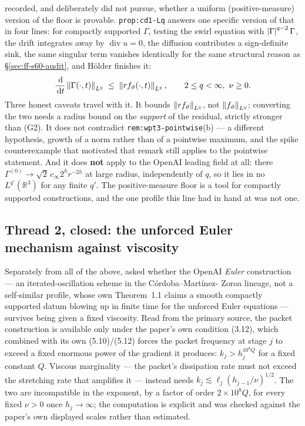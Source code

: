  recorded, and deliberately did not pursue, whether a uniform
(positive-measure) version of the floor is provable. \texttt{prop:cd1-Lq}
answers one specific version of that in four lines: for compactly supported
\(\Gamma\), testing the swirl equation with \(\left|\Gamma\right|^{q-2}\Gamma\), the
drift integrates away by \(\operatorname{div}u=0\), the diffusion contributes
a sign-definite sink, the same singular term vanishes identically for the
same structural reason as \S\ref{sec:ff-s60-audit}, and H\"older finishes it:
\[
\frac{\,\mathrm{d}}{\,\mathrm{d} t}\left\|\Gamma(\cdot,t)\right\|_{L^q}\;\le\;\left\|rf_\vartheta(\cdot,t)\right\|_{L^q},
\qquad 2\le q<\infty,\ \nu\ge0.
\]
Three honest caveats travel with it. It bounds \(\left\|rf_\vartheta\right\|_{L^q}\),
not \(\left\|f_\vartheta\right\|_{L^q}\); converting the two needs a radius bound on
the \emph{support} of the residual, strictly stronger than (G2). It does not
contradict \texttt{rem:wpt3-pointwise}(b) --- a different hypothesis, growth
of a norm rather than of a pointwise maximum, and the spike counterexample
that motivated that remark still applies to the pointwise statement. And it
does \textbf{not} apply to the OpenAI leading field at all: there
\(\Gamma^{(0)}\to\sqrt2\,c_\infty2^hr^{-2h}\) at large radius, independently
of \(q\), so it lies in no \(L^{q'}(\mathbb R^3)\) for any finite \(q'\). The
positive-measure floor is a tool for compactly supported constructions, and
the one profile this line had in hand at  was not one.

\subsection{Thread 2, closed: the unforced Euler mechanism against viscosity}
\label{sec:ff-s60-thread2}

Separately from all of the above,  asked whether the OpenAI \emph{Euler}
construction --- an iterated-oscillation scheme in the C\'ordoba--Mart\'inez-%
Zoroa lineage, not a self-similar profile, whose own Theorem~1.1 claims a
smooth compactly supported datum blowing up in finite time for the unforced
Euler equations --- survives being given a fixed viscosity. Read from the
primary source, the packet construction is available only under the paper's
own condition (3.12), which combined with its own (5.10)/(5.12) forces the
packet frequency at stage \(j\) to exceed a fixed enormous power of the
gradient it produces: \(k_j>h_j^{10^8Q}\) for a fixed constant \(Q\). Viscous
marginality --- the packet's dissipation rate must not exceed the stretching
rate that amplifies it --- instead needs \(k_j\lesssim\ell_j(h_{j-1}/\nu)^{1/2}\).
The two are incompatible in the exponent, by a factor of order \(2\times10^8Q\),
for every fixed \(\nu>0\) once \(h_j\to\infty\); the computation is explicit
and was checked against the paper's own displayed scales rather than
estimated.


